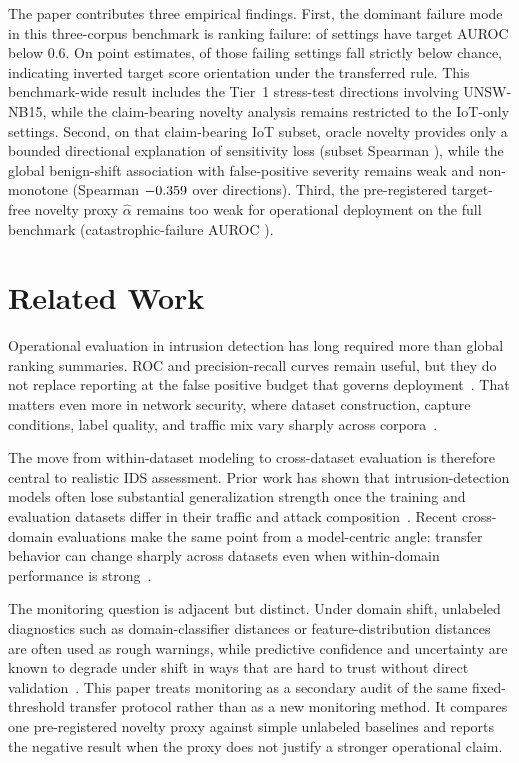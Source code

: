 \documentclass[preprint,12pt]{elsarticle}
\begin{document}
The paper contributes three empirical findings. First, the dominant failure mode in this three-corpus benchmark is ranking failure: \FullRankingFailureCount{} of \NaturalSettingCount{} settings have target AUROC below 0.6. On point estimates, \FullInversionCount{} of those failing settings fall strictly below chance, indicating inverted target score orientation under the transferred rule. This benchmark-wide result includes the Tier~1 stress-test directions involving UNSW-NB15, while the claim-bearing novelty analysis remains restricted to the \PrimaryIotSettingCount{} IoT-only settings. Second, on that claim-bearing IoT subset, oracle novelty provides only a bounded directional explanation of sensitivity loss (subset Spearman \PrimaryOracleSpearman{}), while the global benign-shift association with false-positive severity remains weak and non-monotone (Spearman $-0.359{}$ over \DirectionCount{} directions). Third, the pre-registered target-free novelty proxy $\hat{\alpha}$ remains too weak for operational deployment on the full benchmark (catastrophic-failure AUROC \AlphaHatAllNaturalCatastrophicAuroc{}).

\section{Related Work}

Operational evaluation in intrusion detection has long required more than global ranking summaries. ROC and precision-recall curves remain useful, but they do not replace reporting at the false positive budget that governs deployment~\cite{axelsson2000baserate,fawcett2006roc,davis2006pr}. That matters even more in network security, where dataset construction, capture conditions, label quality, and traffic mix vary sharply across corpora~\cite{ring2019survey}.

The move from within-dataset modeling to cross-dataset evaluation is therefore central to realistic IDS assessment. Prior work has shown that intrusion-detection models often lose substantial generalization strength once the training and evaluation datasets differ in their traffic and attack composition~\cite{sommer2010outside,dhooge2020inter,layeghy2024benchmarking,iwanowski2025choice}. Recent cross-domain evaluations make the same point from a model-centric angle: transfer behavior can change sharply across datasets even when within-domain performance is strong~\cite{ring2019survey}.

The monitoring question is adjacent but distinct. Under domain shift, unlabeled diagnostics such as domain-classifier distances or feature-distribution distances are often used as rough warnings, while predictive confidence and uncertainty are known to degrade under shift in ways that are hard to trust without direct validation~\cite{ben2010domain,ovadia2019uncertainty,rabanser2019failing,hendrycks2017baseline}. This paper treats monitoring as a secondary audit of the same fixed-threshold transfer protocol rather than as a new monitoring method. It compares one pre-registered novelty proxy against simple unlabeled baselines and reports the negative result when the proxy does not justify a stronger operational claim.
\end{document}
